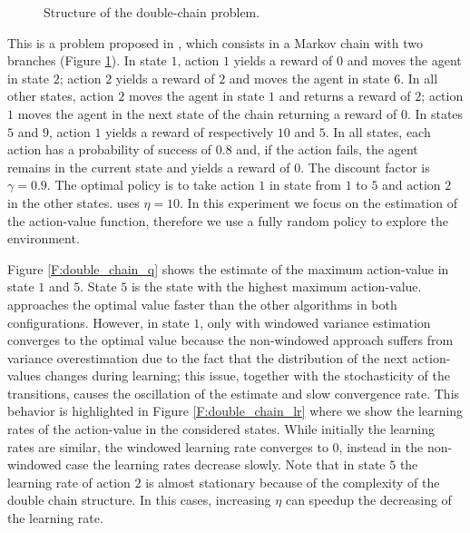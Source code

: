 \documentclass[conference]{IEEEtran}
\begin{document}
\begin{figure}[t]
\begin{center}
\end{center}
\caption{Structure of the double-chain problem.}
\label{F:double-chain}
\end{figure}
This is a problem proposed in \cite{Peters2010RelativeEP}, which consists in a Markov chain with two branches (Figure \ref{F:double-chain}). In state $1$, action $1$ yields a reward of $0$ and moves the agent in state $2$; action $2$ yields a reward of $2$ and moves the agent in state $6$. In all other states, action $2$ moves the agent in state $1$ and returns a reward of $2$; action $1$ moves the agent in the next state of the chain returning a reward of $0$. In states $5$ and $9$, action $1$ yields a reward of respectively $10$ and $5$. In all states, each action has a probability of success of $0.8$ and, if the action fails, the agent remains in the current state and yields a reward of $0$. The discount factor is $\gamma = 0.9$. The optimal policy is to take action $1$ in state from $1$ to $5$ and action $2$ in the other states. \alg uses $\eta = 10$. In this experiment we focus on the estimation of the action-value function, therefore we use a fully random policy to explore the environment.

Figure \ref{F:double_chain_q} shows the estimate of the maximum action-value in state $1$ and $5$. State $5$ is the state with the highest maximum action-value. \alg approaches the optimal value faster than the other algorithms in both configurations. However, in state $1$, only \alg with windowed variance estimation converges to the optimal value because the non-windowed approach suffers from variance overestimation due to the fact that the distribution of the next action-values changes during learning; this issue, together with the stochasticity of the transitions, causes the oscillation of the estimate and slow convergence rate. This behavior is highlighted in Figure \ref{F:double_chain_lr} where we show the learning rates of the action-value in the considered states. While initially the learning rates are similar, the windowed learning rate converges to $0$, instead in the non-windowed case the learning rates decrease slowly. Note that in state $5$ the learning rate of action $2$ is almost stationary because of the complexity of the double chain structure. In this cases, increasing $\eta$ can speedup the decreasing of the learning rate.
\end{document}
